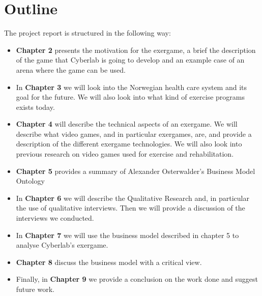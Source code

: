 \section{Outline}
The project report is structured in the following way:
\begin{itemize}
\renewcommand{\labelitemi}{$\bullet$}
\item \textbf{Chapter 2} presents the motivation for the exergame, a brief the description of the game that Cyberlab is going to develop and an example case of an arena where the game can be used.
\item In \textbf{Chapter 3} we will look into the Norwegian health care system and its goal for the future. We will also look into what kind of exercise programs exists today.
\item	\textbf{Chapter 4} will describe the technical aspects of an exergame. We will describe what video games, and in particular exergames, are, and provide a description of the different exergame technologies. We will also look into previous research on video games used for exercise and rehabilitation.
\item	\textbf{Chapter 5} provides a summary of Alexander Osterwalder's Business Model Ontology
\item	In \textbf{Chapter 6} we will describe the Qualitative Research and, in particular the use of qualitative interviews. Then we will provide a discussion of the interviews we conducted.
\item In \textbf{Chapter 7} we will use the business model described in chapter 5 to analyse Cyberlab's exergame.
\item  \textbf{Chapter 8} discuss the business model with a critical view.
\item Finally, in \textbf{Chapter 9} we provide a conclusion on the work done and suggest future work.
\end{itemize}